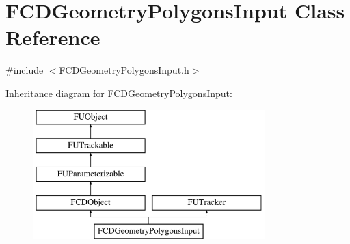 \hypertarget{classFCDGeometryPolygonsInput}{
\section{FCDGeometryPolygonsInput Class Reference}
\label{classFCDGeometryPolygonsInput}
}


{\ttfamily \#include $<$FCDGeometryPolygonsInput.h$>$}

Inheritance diagram for FCDGeometryPolygonsInput:\begin{figure}[H]
\begin{center}
\leavevmode
\includegraphics[height=5.000000cm]{classFCDGeometryPolygonsInput}
\end{center}
\end{figure}
